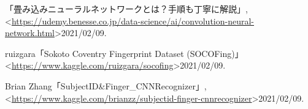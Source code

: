 \documentclass[a4paper, 11pt, titlepage]{jsarticle}
\begin{document}
\begin{thebibliography}{n}
「畳み込みニューラルネットワークとは？手順も丁寧に解説」, \\
  \textless \url{https://udemy.benesse.co.jp/data-science/ai/convolution-neural-network.html}\textgreater 2021/02/09.
  
  ruizgara「Sokoto Coventry Fingerprint Dataset (SOCOFing)」\\
  \textless \url{https://www.kaggle.com/ruizgara/socofing}\textgreater 2021/02/09.
  
  Brian Zhang「SubjectID\&Finger\_CNNRecognizer」, \\
  \textless \url{https://www.kaggle.com/brianzz/subjectid-finger-cnnrecognizer}\textgreater 2021/02/09.
  
\end{thebibliography}
\end{document}
